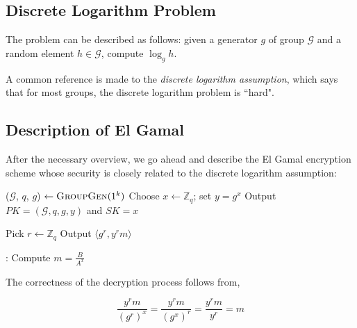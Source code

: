 \subsection{Discrete Logarithm Problem}

The problem can be described as follows: given a generator $ g $ of group $ \mathcal{G} $ and a random element $ h \in \mathcal{G} $, compute $ \log_g h $.

A common reference is made to the \textit{discrete logarithm assumption}, which says that for most groups, the discrete logarithm problem is ``hard".

\subsection{Description of El Gamal}

After the necessary overview, we go ahead and describe the El Gamal encryption scheme whose security is closely related to the discrete logarithm assumption:

\begin{algorithmic}
\STATE ($ \mathcal{G} $, $ q $, $ g $) $ \leftarrow \textsc{GroupGen} (1^k) $ 
\STATE Choose $ x \leftarrow \mathbb{Z}_q $; set $ y = g^x $ 
\STATE Output $ PK = ( \mathcal{G}, q, g, y) $ and $ SK = x $ 
\end{algorithmic}

\begin{algorithmic}
\STATE Pick $ r \leftarrow \mathbb{Z}_q $ 
\STATE Output $ \langle g^r, y^r m \rangle $ 
\end{algorithmic}

\begin{algorithmic}
:
\STATE Compute $ m = \frac{B}{A^x} $ 
\end{algorithmic}

The correctness of the decryption process follows from,

\begin{equation*}
\frac{y^r m}{(g^r)^x} = \frac{y^r m}{(g^x)^r} = \frac{y^r m }{y^r} = m
\end{equation*}

